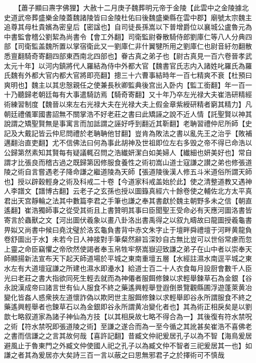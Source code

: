 　　【蕭子顯曰燾字佛狸】大赦十二月庚子魏葬明元帝于金陵【此雲中之金陵據北史道武帝葬盛樂金陵蓋魏諸陵皆曰金陵杜佑曰後魏盛樂縣在雲中郡】廟號太宗魏主追尊其母杜貴嬪為密皇后【密諡也】自司徒長孫嵩以下普增爵位以襄城公盧魯元為中書監會稽公劉絜為尚書令【會工外翻】司衛監尉眷散騎侍郎劉庫仁等八人分典四部【司衛監盖魏所置以掌宿衛此又一劉庫仁非什翼犍所用之劉庫仁也尉音紆勿翻散悉亶翻騎奇寄翻四部東西南北四部也】眷古真之弟子也【尉古真見一百六卷晉孝武太元十年】以河内鎮將代人羅結為侍中外都大官【魏書官氏志内入諸姓叱羅氏為羅氏魏有外都大官内都大官將即亮翻】摠三十六曹事結時年一百七精爽不衰【杜預曰爽明也】魏主以其忠慤親任之使兼長秋卿監典後宫出入卧内【監工銜翻】年一百一十乃聽歸老朝廷每有大事遣騎訪焉【騎奇寄翻】又十年乃卒左光禄大夫崔浩研精經術練習制度【魏晉以來左右光禄大夫在光禄大夫上假金章紫綬研精者窮其精力】凡朝廷禮儀軍國書詔無不關掌浩不好老莊之書曰此矯誣之說不近人情【託聖賢以神其說謂之矯聖賢無是事寓言而加詆謂之誣好呼到翻近其靳翻】老聃習禮仲尼所師【史記及大戴記皆云仲尼問禮於老聃聃他甘翻】豈肯為敗法之書以亂先王之治乎【敗補邁翻治直吏翻】尤不信佛法曰何為事此胡神及世祖即位左右多毁之帝不得已命浩以公歸第然素知其賢每有疑議輒召問之浩纎妍潔白如美婦人【纎細也妍美好也】常自謂才比張良而稽古過之既歸第因修服食養性之術初嵩山道士寇謙之讃之弟也修張道陵之術自言嘗遇老子降命謙之繼道陵為天師【張道陵後漢人修五斗米道俗所謂天師也】授以辟穀輕身之術及科戒二十卷【今道家科戒盖始於此】使之清整道教又遇神人李譜文【譜博古翻】云老子之玄孫也授以圖籙真經六十餘卷使之輔佐北方太平真君出天宫靜輪之法其中數篇李君之手筆也謙之奉其書獻於魏主朝野多未之信【朝直遙翻】崔浩獨師事之從受其術且上書贊明其事曰臣聞聖王受命必有天應河圖洛書皆寄言於蟲獸之文【河出圖伏羲象以畫八卦洛出書禹得之以叙九疇故曰龍圖授羲龜書畀姒又尚書中候曰堯沈璧於洛玄龜負書背中赤文朱字止于壇畔舜禮壇于河畔黄龍負卷舒圖出于水】未若今日人神接對手筆粲然辭旨深妙自古無比豈可以世俗常慮而忽上靈之命臣竊懼之帝欣然使謁者奉玉帛牲牢祭嵩嶽迎致謙之弟子在山中者以崇奉天師顯揚新法宣布天下起天師道場於平城之東南重壇五層【水經註濕水南逕平城之東水左有大道壇寇謙之所建也濕水即灅水】給道士百二十人衣食每月設厨會數千人臣光曰老莊之書大指欲同死生輕去就而為神僊者服餌修鍊以求輕舉鍊草石為金銀【谷永說漢成帝曰諸言世有仙人服食不終之藥遙興輕舉登遐倒景覽觀縣圃浮遊蓬萊黄冶變化皆姦人惑衆挾左道懷詐偽以欺罔世主服餌修鍊以求輕舉即谷永所謂服食不終之藥遙興輕舉者也鍊草石以為金銀即谷永所謂黄冶變化者也】其為術正相戾矣是以劉歆七略叙道家為諸子神仙為方技【以其相戾故七略不得合為一】其後復有符水禁呪之術【符水禁呪即張道陵之術】至謙之遂合而為一至今循之其訛甚矣崔浩不喜佛老之書而信謙之之言其故何哉【喜許記翻】昔臧文仲祀爰居孔子以為不智【海鳥爰居避風止于魯東門之外臧文仲使國人祀之孔子以為臧文仲不智者三祀爰居其一也】如謙之者其為爰居亦大矣詩三百一言以蔽之曰思無邪君子之於擇術可不慎哉


